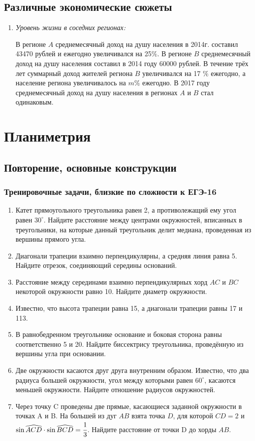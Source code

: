 \documentclass[12pt]{article}
\begin{document}
    \subsection{Различные экономические сюжеты}
    \begin{enumerate}[start=1,label={\itshape\bfseries \arabic*.}]
    \item \emph{Уровень жизни в соседних регионах:}

    В регионе $A$ среднемесячный доход на душу населения в 2014г. составил 43470 рублей и ежегодно увеличивался на 25$\%$. В регионе $B$ среднемесячный доход на душу населения составил в 2014 году 60000 рублей. В течение трёх лет суммарный доход жителей региона $B$ увеличивался на 17 $\%$ ежегодно, а население региона увеличивалось на $m\%$ ежегодно. В 2017 году среднемесячный доход на душу населения в регионах $A$ и $B$ стал одинаковым.
    \end{enumerate}
\newpage
\section{Планиметрия}
\subsection{Повторение, основные конструкции}

\subsubsection*{Тренировочные задачи, близкие по сложности к ЕГЭ-16}
 \begin{enumerate}[start=1,label={\itshape\bfseries \arabic*.}]
	\item Катет прямоугольного треугольника равен 2, а противолежащий ему угол равен $30^{\circ}$. Найдите расстояние между центрами окружностей, вписанных в треугольники, на которые данный треугольник делит медиана, проведенная из вершины прямого угла.
	\item Диагонали трапеции взаимно перпендикулярны, а средняя линия равна 5. Найдите отрезок, соединяющий середины оснований.
	\item Расстояние между серединами взаимно перпендикулярных хорд $AC$ и $BC$ некоторой окружности равно 10. Найдите диаметр окружности.
	\item Известно, что высота трапеции равна 15, а диагонали трапеции равны 17 и 113.
	\item В равнобедренном треугольнике основание и боковая сторона равны соответственно 5 и 20. Найдите биссектрису треугольника, проведённую из вершины угла при основании.
	\item Две окружности касаются друг друга внутренним образом. Известно, что два радиуса большей окружности, угол между которыми равен $60^{\circ}$, касаются меньшей окружности. Найдите отношение радиусов окружностей.
	\item Через точку C проведены две прямые, касающиеся заданной окружности в точках A и B. На большей из дуг $AB$ взята точка $D$, для которой $CD = 2$ и $\sin{\widehat{ACD}} \cdot \sin{\widehat{BCD}} = \cfrac{1}{3}$. Найдите расстояние от точки D до хорды $AB$.
\end{enumerate}
\end{document}
